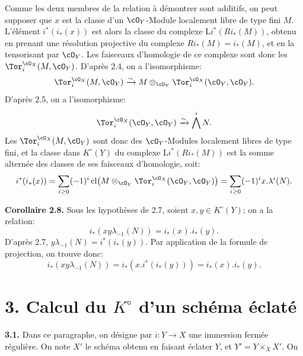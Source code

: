 Comme les deux membres de la relation à démontrer sont additifs, on peut supposer que \(x\) est la classe d'un \(\cO_Y\)-Module localement libre de type fini \(M\). L'élément \(i^*(i_*(x))\) est alors la classe du complexe \(\mathrm L i^*(Ri_*(M))\), obtenu en prenant une résolution projective du complexe \(Ri_*(M)=i_*(M)\), et en la tensorisant par \(\cO_Y\). Les faisceaux d'homologie de ce complexe sont donc les \(\Tor_i^{\cO_X}(M,\cO_Y)\). D'après 2.4, on a l'isomorphisme:
\[
\Tor_i^{\cO_X}(M,\cO_Y)
\xrightarrow{\sim}
M\otimes_{\cO_Y}\Tor_i^{\cO_X}(\cO_Y,\cO_Y).
\]
D'après 2.5, on a l'isomorphisme:
\[
\Tor_i^{\cO_X}(\cO_Y,\cO_Y)
\xrightarrow{\sim}
\bigwedge^i N.
\]
Les \(\Tor_i^{\cO_X}(M,\cO_Y)\) sont donc des \(\cO_Y\)-Modules localement libres de type fini, et la classe dans \(K^\circ(Y)\) du complexe \(\mathrm L i^*(Ri_*(M))\) est la somme alternée des classes de ses faisceaux d'homologie, soit:
\[
i^*(i_*(x))=\sum_{i\ge0}(-1)^i
\operatorname{cl}\bigl(M\otimes_{\cO_Y}\Tor_i^{\cO_X}(\cO_Y,\cO_Y)\bigr)
=\sum_{i\ge0}(-1)^i x.\lambda^i(N).
\]

\textbf{Corollaire 2.8.} Sous les hypothèses de 2.7, soient \(x,y\in K^\circ(Y)\); on a la relation:
\begin{equation}\tag{2.8.1}
i_*(xy\lambda_{-1}(N))=i_*(x).i_*(y).
\end{equation}
D'après 2.7, \(y\lambda_{-1}(N)=i^*(i_*(y))\). Par application de la formule de projection, on trouve donc:
\[
i_*(xy\lambda_{-1}(N))
=i_*(x.i^*(i_*(y)))
=i_*(x).i_*(y).
\]

\section*{3. Calcul du \texorpdfstring{$K^\circ$}{K} d'un schéma éclaté}

\textbf{3.1.} Dans ce paragraphe, on désigne par \(i:Y\to X\) une immersion fermée régulière. On note \(X'\) le schéma obtenu en faisant éclater \(Y\), et \(Y'=Y\times_X X'\). On
